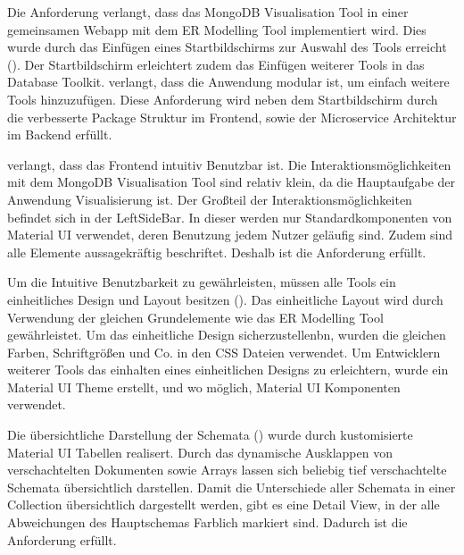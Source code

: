 \iffalse
Aufgabe des Kapitels Evaluierung ist es, in wie weit die Ziele der 
Arbeit erreicht wurden. Es sollen also die erreichten Arbeitsergebnisse 
mit den Zielen verglichen werden. Ergebnis der Evaluierung kann auch 
sein, das bestimmte Ziele nicht erreicht werden konnten, wobei die 
Ursachen hierfür auch außerhalb des Verantwortungsbereichs des 
Praktikanten liegen können.
\fi

Die Anforderung  verlangt, dass das MongoDB Visualisation Tool in einer gemeinsamen Webapp mit dem ER Modelling Tool implementiert wird.
Dies wurde durch das Einfügen eines Startbildschirms zur Auswahl des Tools erreicht ().
Der Startbildschirm erleichtert zudem das Einfügen weiterer Tools in das Database Toolkit.
 verlangt, dass die Anwendung modular ist, um einfach weitere Tools hinzuzufügen.
Diese Anforderung wird neben dem Startbildschirm durch die verbesserte Package Struktur im Frontend, sowie der Microservice Architektur im Backend erfüllt.

 verlangt, dass das Frontend intuitiv Benutzbar ist.
Die Interaktionsmöglichkeiten mit dem MongoDB Visualisation Tool sind relativ klein, da die Hauptaufgabe der Anwendung Visualisierung ist.
Der Großteil der Interaktionsmöglichkeiten befindet sich in der LeftSideBar.
In dieser werden nur Standardkomponenten von Material UI verwendet, deren Benutzung jedem Nutzer geläufig sind.
Zudem sind alle Elemente aussagekräftig beschriftet.
Deshalb ist die Anforderung  erfüllt.

Um die Intuitive Benutzbarkeit zu gewährleisten, müssen alle Tools ein einheitliches Design und Layout besitzen ().
Das einheitliche Layout wird durch Verwendung der gleichen Grundelemente wie das ER Modelling Tool gewährleistet.
Um das einheitliche Design sicherzustellenbn, wurden die gleichen Farben, Schriftgrößen und Co. in den CSS Dateien verwendet.
Um Entwicklern weiterer Tools das einhalten eines einheitlichen Designs zu erleichtern, wurde ein Material UI Theme erstellt, und wo möglich, Material UI Komponenten verwendet.

Die übersichtliche Darstellung der Schemata () wurde durch kustomisierte Material UI Tabellen realisert.
Durch das dynamische Ausklappen von verschachtelten Dokumenten sowie Arrays lassen sich beliebig tief verschachtelte Schemata übersichtlich darstellen.
Damit die Unterschiede aller Schemata in einer Collection übersichtlich dargestellt werden, gibt es eine Detail View, in der alle Abweichungen des Hauptschemas Farblich markiert sind.
Dadurch ist die Anforderung  erfüllt.

